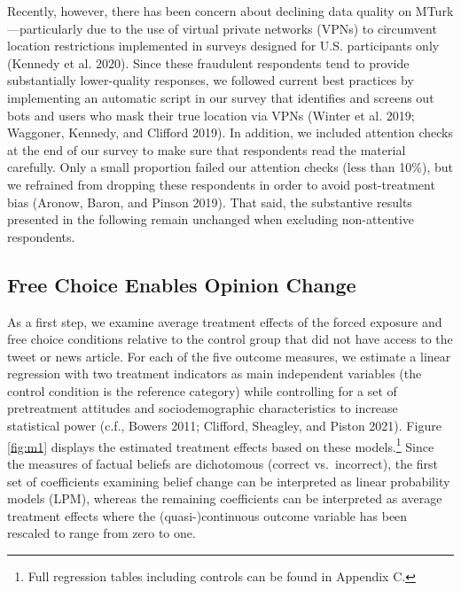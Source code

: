 \documentclass[
  12pt,
]{article}
\begin{document}
Recently, however, there has been concern about declining data quality
on MTurk---particularly due to the use of virtual private networks
(VPNs) to circumvent location restrictions implemented in surveys
designed for U.S. participants only (Kennedy et al. 2020). Since these
fraudulent respondents tend to provide substantially lower-quality
responses, we followed current best practices by implementing an
automatic script in our survey that identifies and screens out bots and
users who mask their true location via VPNs (Winter et al. 2019;
Waggoner, Kennedy, and Clifford 2019). In addition, we included
attention checks at the end of our survey to make sure that respondents
read the material carefully. Only a small proportion failed our
attention checks (less than 10\%), but we refrained from dropping these
respondents in order to avoid post-treatment bias (Aronow, Baron, and
Pinson 2019). That said, the substantive results presented in the
following remain unchanged when excluding non-attentive respondents.

\hypertarget{free-choice-enables-opinion-change}{%
\subsection{Free Choice Enables Opinion
Change}\label{free-choice-enables-opinion-change}}

As a first step, we examine average treatment effects of the forced
exposure and free choice conditions relative to the control group that
did not have access to the tweet or news article. For each of the five
outcome measures, we estimate a linear regression with two treatment
indicators as main independent variables (the control condition is the
reference category) while controlling for a set of pretreatment
attitudes and sociodemographic characteristics to increase statistical
power (c.f., Bowers 2011; Clifford, Sheagley, and Piston 2021). Figure
\ref{fig:m1} displays the estimated treatment effects based on these
models.\footnote{Full regression tables including controls can be found
  in Appendix C.} Since the measures of factual beliefs are dichotomous
(correct vs.~incorrect), the first set of coefficients examining belief
change can be interpreted as linear probability models (LPM), whereas
the remaining coefficients can be interpreted as average treatment
effects where the (quasi-)continuous outcome variable has been rescaled
to range from zero to one.
\end{document}
